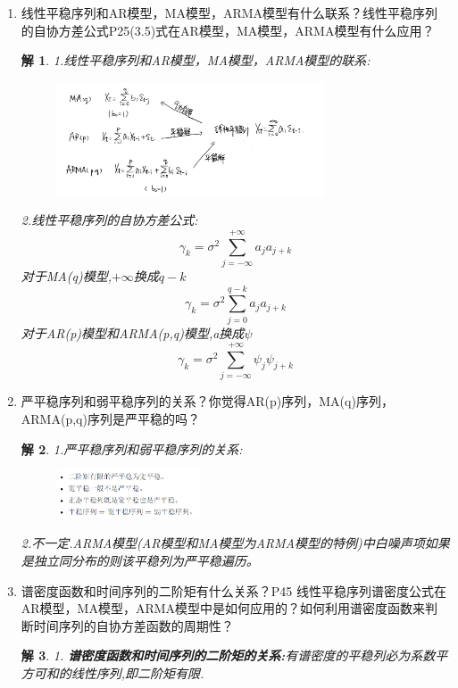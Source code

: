 \documentclass[11pt,a4paper]{ctexart}
\newtheorem*{solution}{解}
\begin{document}
\begin{enumerate}
\item[3.] 线性平稳序列和AR模型，MA模型，ARMA模型有什么联系？线性平稳序列的自协方差公式P25(3.5)式在AR模型，MA模型，ARMA模型有什么应用？
\begin{solution}
	1.线性平稳序列和AR模型，MA模型，ARMA模型的联系:
	\begin{figure}[H]
		\centering
		\includegraphics[width=0.75\textwidth]{2.jpg}  
	\end{figure}
2.线性平稳序列的自协方差公式:
\begin{equation}
	\gamma_k=\sigma^2\sum_{j=-\infty}^{+\infty}a_ja_{j+k}
\end{equation}
对于MA(q)模型,$ +\infty $换成$ q-k $
\begin{equation}
	\gamma_k=\sigma^2\sum_{j=0}^{q-k}a_ja_{j+k}
\end{equation}
对于AR(p)模型和ARMA(p,q)模型,a换成$ \psi $
\begin{equation}
	\gamma_k=\sigma^2\sum_{j=-\infty}^{+\infty}\psi_j\psi_{j+k}
\end{equation}

\end{solution}

\item[4.] 严平稳序列和弱平稳序列的关系？你觉得AR(p)序列，MA(q)序列，ARMA(p,q)序列是严平稳的吗？
\begin{solution}
	1.严平稳序列和弱平稳序列的关系:
	\begin{figure}[H]
		\centering
		\includegraphics[width=0.4\textwidth]{2.png}  
	\end{figure}

2.不一定.ARMA模型(AR模型和MA模型为ARMA模型的特例)中白噪声项如果是独立同分布的则该平稳列为严平稳遍历。
\end{solution}	

\item[5.]谱密度函数和时间序列的二阶矩有什么关系？P45 线性平稳序列谱密度公式在AR模型，MA模型，ARMA模型中是如何应用的？如何利用谱密度函数来判断时间序列的自协方差函数的周期性？
\begin{solution}
	1. \textbf{谱密度函数和时间序列的二阶矩的关系:}有谱密度的平稳列必为系数平方可和的线性序列,即二阶矩有限.
	

\end{solution}
\end{enumerate}
\end{document}
